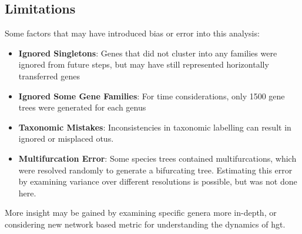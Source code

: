 \subsection{Limitations}
Some factors that may have introduced bias or error into this analysis:
\begin{itemize}
        \item \textbf{Ignored Singletons}: Genes that did not cluster into any families were ignored from future steps, but may have still represented horizontally transferred genes
        \item \textbf{Ignored Some Gene Families}: For time considerations, only 1500 gene trees were generated for each genus
        \item \textbf{Taxonomic Mistakes}: Inconsistencies in taxonomic labelling can result in ignored or misplaced \ac{otu}s.
        \item \textbf{Multifurcation Error}: Some species trees contained multifurcations, which were resolved randomly to generate a bifurcating tree. Estimating this error by examining variance over different resolutions is possible, but was not done here.
\end{itemize}
More insight may be gained by examining specific genera more in-depth, or considering new network based metric for understanding the dynamics of \ac{hgt}.
